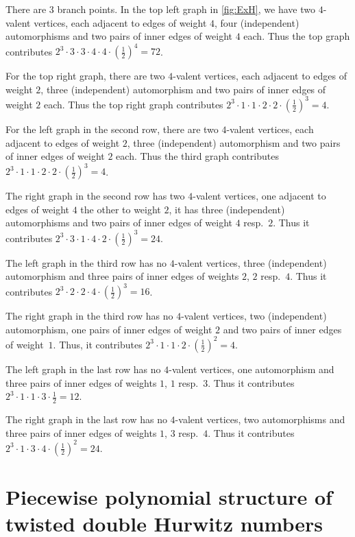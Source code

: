 \documentclass[ALCO,published]{cedram}
\begin{document}
\begin{exam}
There are $3$ branch points. In the top left graph in \cref{fig:ExH}, we have two $4$-valent vertices, each adjacent to edges of weight $4$, four (independent) automorphisms and two pairs of inner edges of weight $4$ each. Thus the top graph contributes $2^3 \cdot 3\cdot 3\cdot 4\cdot 4\cdot (\frac{1}{2})^4=72$.

For the top right graph, there are two $4$-valent vertices, each adjacent to edges of weight $2$, three (independent) automorphism and two pairs of inner edges of weight $2$ each. Thus the top right graph contributes $2^3\cdot 1\cdot 1\cdot 2\cdot 2\cdot (\frac{1}{2})^3=4$.

For the left graph in the second row, there are two $4$-valent vertices, each adjacent to edges of weight $2$, three (independent) automorphism and two pairs of inner edges of weight $2$ each. Thus the third graph contributes $2^3\cdot 1\cdot 1\cdot 2\cdot 2\cdot (\frac{1}{2})^3=4$.

The right graph in the second row has two $4$-valent vertices, one adjacent to edges of weight $4$ the other to weight $2$, it has three (independent) automorphisms and two pairs of inner edges of weight $4$ resp.\ $2$. Thus it contributes $2^3\cdot 3\cdot 1\cdot 4\cdot 2\cdot (\frac{1}{2})^3=24$.

The left graph in the third row has no $4$-valent vertices, three (independent) automorphism and three pairs of inner edges of weights $2$, $2$ resp.\ $4$. Thus it contributes $2^3\cdot 2\cdot 2\cdot 4\cdot (\frac{1}{2})^3=16$.

The right graph in the third row has no $4$-valent vertices, two (independent) automorphism, one pairs of inner edges of weight $2$ and two pairs of inner edges of weight~$1$. Thus, it contributes $2^3\cdot 1\cdot 1\cdot 2\cdot (\frac{1}{2})^2=4$.

The left graph in the last row has no $4$-valent vertices, one automorphism and three pairs of inner edges of weights $1$, $1$ resp.\ $3$. Thus it contributes $2^3\cdot 1\cdot 1\cdot 3\cdot \frac{1}{2}=12$.

The right graph in the last row has no $4$-valent vertices, two automorphisms and three pairs of inner edges of weights $1$, $3$ resp.\ $4$. Thus it contributes $2^3\cdot 1\cdot 3\cdot 4\cdot (\frac{1}{2})^2=24$.
\end{exam}

\section{Piecewise polynomial structure of twisted double Hurwitz numbers}
\label{sec:poly}
\end{document}
